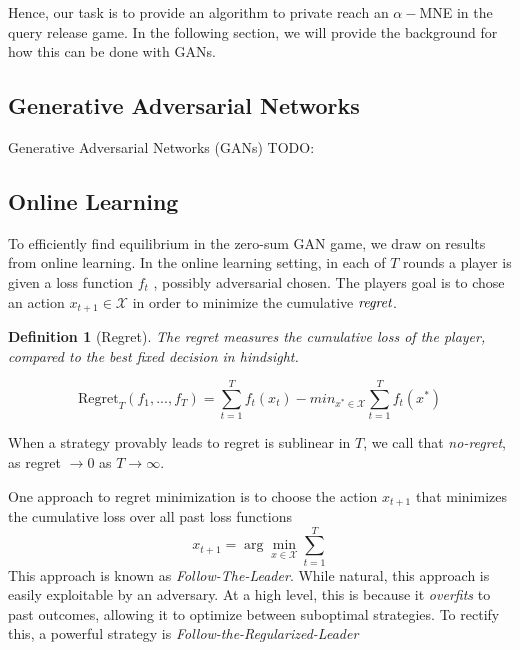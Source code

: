 \documentclass[]{article}
\newcommand{\X}{\mathcal{X}}
\newcommand{\todo}[1]{}
\renewcommand{\todo}[1]{{\color{red} TODO: {#1}}}
\newtheorem{definition}{Definition}
\begin{document}
Hence, our task is to provide an algorithm to private reach an $\alpha-$MNE in the query release game. In the following section, we will provide the background for how this can be done with GANs.



\subsection{Generative Adversarial Networks}

Generative Adversarial Networks (GANs) \todo{}


\subsection{Online Learning}

To efficiently find equilibrium in the zero-sum GAN game, we draw on results from online learning. In the online learning setting, in each of $T$ rounds a player is given a loss function $f_t$ , possibly adversarial chosen. The players goal is to chose an action $x_{t+1} \in \mathcal{X}$ in order to minimize the cumulative $\emph{regret}$. 

\begin{definition}[Regret]
    The regret measures the cumulative loss of the player, compared to the best fixed decision in hindsight. 

    \begin{equation}
        \text{Regret}_T(f_1,...,f_T) = \sum_{t=1}^T f_t(x_t) - min_{x^* \in \mathcal{X}} \sum_{t=1}^T f_t(x^*)
    \end{equation}
\end{definition}

When a strategy provably leads to regret is sublinear in $T$, we call that \emph{no-regret}, as regret $\to 0$ as $T \to \infty$.

One approach to regret minimization is to choose the action $x_{t+1}$ that minimizes the cumulative loss over all past loss functions
\begin{equation}
    x_{t+1} = \arg\min_{x \in \X} \sum_{t=1}^T
\end{equation}
This approach is known as \emph{Follow-The-Leader}. While natural, this approach is easily exploitable by an adversary. At a high level, this is because it \emph{overfits} to past outcomes, allowing it to optimize between suboptimal strategies. To rectify this, a powerful strategy is \emph{Follow-the-Regularized-Leader}
\end{document}
